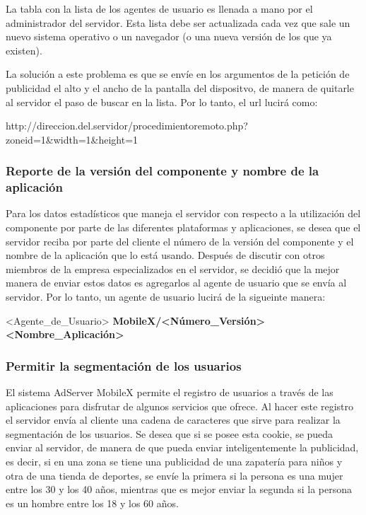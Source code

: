 La tabla con la lista de los agentes de usuario es llenada a mano
por el administrador del servidor. Esta lista debe ser actualizada
cada vez que sale un nuevo sistema operativo o un navegador (o una
nueva versión de los que ya existen).

La solución a este problema es que se envíe en los argumentos de la
petición de publicidad el alto y el ancho de la pantalla del dispositvo,
de manera de quitarle al servidor el paso de buscar en la lista. Por
lo tanto, el url lucirá como: 

\begin{center}
http://direccion.del.servidor/procedimientoremoto.php?zoneid=1\&width=1\&height=1
\par\end{center}


\subsubsection{Reporte de la versión del componente y nombre de la aplicación}

Para los datos estadísticos que maneja el servidor con respecto a
la utilización del componente por parte de las diferentes plataformas
y aplicaciones, se desea que el servidor reciba por parte del cliente
el número de la versión del componente y el nombre de la aplicación
que lo está usando. Después de discutir con otros miembros de la empresa
especializados en el servidor, se decidió que la mejor manera de enviar
estos datos es agregarlos al agente de usuario que se envía al servidor.
Por lo tanto, un agente de usuario lucirá de la sigueinte manera:

\begin{center}
<Agente\_de\_Usuario> \textbf{MobileX/<Número\_Versión>} \textbf{<Nombre\_Aplicación>}
\par\end{center}


\subsubsection{Permitir la segmentación de los usuarios}

El sistema AdServer MobileX permite el registro de usuarios a través
de las aplicaciones para disfrutar de algunos servicios que ofrece.
Al hacer este registro el servidor envía al cliente una cadena de
caracteres que sirve para realizar la segmentación de los usuarios.
Se desea que si se posee esta cookie, se pueda enviar al servidor,
de manera de que pueda enviar inteligentemente la publicidad, es decir,
si en una zona se tiene una publicidad de una zapatería para niños
y otra de una tienda de deportes, se envíe la primera si la persona
es una mujer entre los 30 y los 40 años, mientras que es mejor enviar
la segunda si la persona es un hombre entre los 18 y los 60 años.

